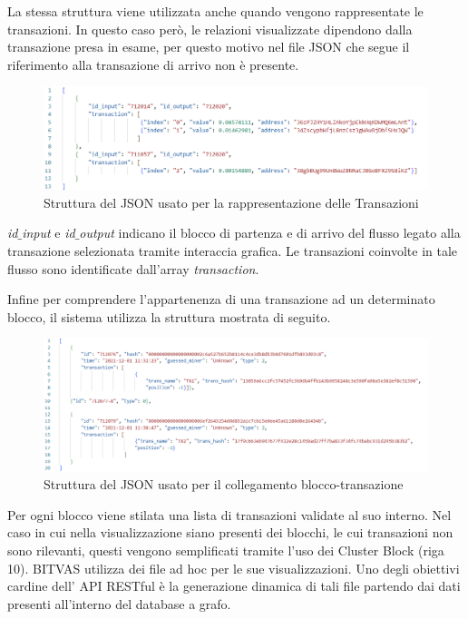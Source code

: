 \thispagestyle{mystyle}
La stessa struttura viene utilizzata anche quando vengono rappresentate le transazioni. In questo caso però, le relazioni visualizzate dipendono dalla transazione presa in esame, per questo motivo nel file JSON che segue il riferimento alla transazione di arrivo non è presente.

\begin{figure}[H]
    \centering \includegraphics[keepaspectratio=true,scale=0.5]{Images/TX_JSON_BITVAS.png}
    \caption{Struttura del JSON usato per la rappresentazione delle Transazioni}
\end{figure}

\textit{id$\_$input} e \textit{id$\_$output} indicano il blocco di partenza e di arrivo del flusso legato alla transazione selezionata tramite interaccia grafica.
Le transazioni coinvolte in tale flusso sono identificate dall'array \textit{transaction}.

Infine per comprendere l'appartenenza di una transazione ad un determinato blocco, il sistema utilizza la struttura mostrata di seguito.


\begin{figure}[H]
    \centering \includegraphics[keepaspectratio=true,scale=0.4]{Images/JSON_Definizione_TX.png}
    \caption{Struttura del JSON usato per il collegamento blocco-transazione}
\end{figure}

Per ogni blocco viene stilata una lista di transazioni validate al suo interno.
Nel caso in cui nella visualizzazione siano presenti dei blocchi, le cui transazioni non sono rilevanti, questi vengono semplificati tramite l'uso dei Cluster Block (riga 10).
BITVAS utilizza dei file ad hoc per le sue visualizzazioni.
Uno degli obiettivi cardine dell' API RESTful è la generazione dinamica di tali file partendo dai dati presenti all'interno del database a grafo.


